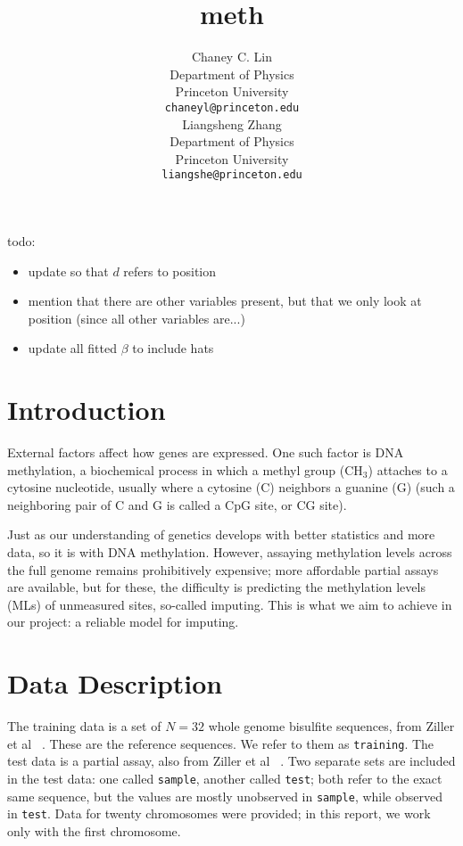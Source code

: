 \documentclass{article} %
\title{meth}
\author{
Chaney C. Lin\\
Department of Physics\\
Princeton University\\
\texttt{chaneyl@princeton.edu} \\
\And
Liangsheng Zhang\\
Department of Physics\\
Princeton University\\
\texttt{liangshe@princeton.edu} \\
}
\begin{document}
\maketitle

\begin{abstract}
\end{abstract}

todo:
\begin{itemize}
\item update so that $d$ refers to position
\item mention that there are other variables present, but that we only look at position (since all other variables are...)
\item update all fitted $\beta$ to include hats
\end{itemize}
\section{Introduction}

External factors affect how genes are expressed. One such factor is DNA methylation, a biochemical process in which a methyl group (CH$_3$) attaches to a cytosine nucleotide, usually where a cytosine (C) neighbors a guanine (G) (such a neighboring pair of C and G is called a CpG site, or CG site).

Just as our understanding of genetics develops with better statistics and more data, so it is with DNA methylation. However, assaying methylation levels across the full genome remains prohibitively expensive; more affordable partial assays are available, but for these, the difficulty is predicting the methylation levels (MLs) of unmeasured sites, so-called imputing. This is what we aim to achieve in our project: a reliable model for imputing.

\section{Data Description}

The training data is a set of $N = 32$ whole genome bisulfite sequences, from Ziller et al ~\cite{ziller2013charting}. These are the reference sequences. We refer to them as \texttt{training}. The test data is a partial assay, also from Ziller et al ~\cite{ziller2013charting}. Two separate sets are included in the test data: one called \texttt{sample}, another called \texttt{test}; both refer to the exact same sequence, but the values are mostly unobserved in \texttt{sample}, while observed in \texttt{test}. Data for twenty chromosomes were provided; in this report, we work only with the first chromosome.
\end{document}
